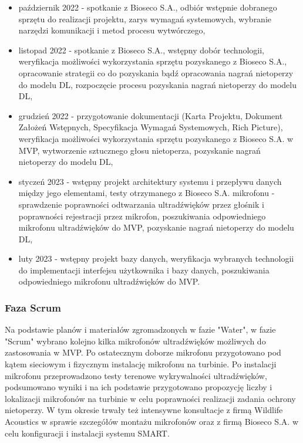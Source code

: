 \documentclass{sprz}
\begin{document}
\begin{itemize}
  \item{październik 2022 - spotkanie z Bioseco S.A., odbiór wstępnie dobranego sprzętu do realizacji projektu, zarys wymagań systemowych, wybranie narzędzi komunikacji i metod procesu wytwórczego,}
  \item{listopad 2022 - spotkanie z Bioseco S.A., wstępny dobór technologii, weryfikacja możliwości wykorzystania sprzętu pozyskanego z Bioseco S.A., opracowanie strategii co do pozyskania bądź opracowania nagrań nietoperzy do modelu DL, rozpoczęcie procesu pozyskania nagrań nietoperzy do modelu DL,}
  \item{grudzień 2022 - przygotowanie dokumentacji (Karta Projektu, Dokument Założeń Wstępnych, Specyfikacja Wymagań Systemowych, Rich Picture), weryfikacja możliwości wykorzystania sprzętu pozyskanego z Bioseco S.A. w MVP, wytworzenie sztucznego głosu nietoperza, pozyskanie nagrań nietoperzy do modelu DL,}
  \item{styczeń 2023 - wstępny projekt architektury systemu i przepływu danych między jego elementami, testy otrzymanego z Bioseco S.A. mikrofonu - sprawdzenie poprawności odtwarzania ultradźwięków przez głośnik i poprawności rejestracji przez mikrofon, poszukiwania odpowiedniego mikrofonu ultradźwięków do MVP, pozyskanie nagrań nietoperzy do modelu DL,}
  \item {luty 2023 - wstępny projekt bazy danych, weryfikacja wybranych technologii do implementacji interfejsu użytkownika i bazy danych, poszukiwania odpowiedniego mikrofonu ultradźwięków do MVP.}
  \end{itemize}

\subsubsection{Faza Scrum}
Na podstawie planów i materiałów zgromadzonych w fazie "Water", w fazie "Scrum" wybrano kolejno kilka mikrofonów ultradźwięków możliwych do zastosowania w MVP. Po ostatecznym doborze mikrofonu przygotowano pod kątem sieciowym i fizycznym instalację mikrofonu na turbinie. Po instalacji mikrofonu przeprowadzono testy terenowe wykrywalności ultradźwięków, podsumowano wyniki i na ich podstawie przygotowano propozycję liczby i lokalizacji mikrofonów na turbinie w celu poprawności realizacji zadania ochrony nietoperzy. W tym okresie trwały też intensywne konsultacje z firmą Wildlife Acoustics w sprawie szczegółów montażu mikrofonów oraz z firmą Bioseco S.A. w celu konfiguracji i instalacji systemu SMART. 
\end{document}
